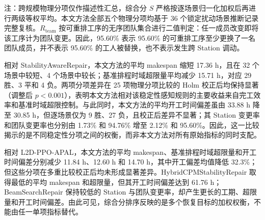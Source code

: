 \documentclass[journal,10pt]{IEEEtran}
\begin{document}
注：跨规模物理分项仅作描述性汇总，综合分 \(S\) 严格按逐场景归一化加权后再进行两级等权平均。本文方法全部五个物理分项均基于 36 个锁定扰动场景推断记录完整复核。\(R_{\mathrm{team}}\) 按可重排工序的无序团队集合进行二值判定：任一成员改变即将该工序计为团队变更。因此，95.60\% 表示 95.60\% 的可重排工序至少更换了一名团队成员，并不表示 95.60\% 的工人被替换，也不表示发生跨 Station 调动。

相对 Stability\allowbreak{}Aware\allowbreak{}Repair，本文方法的平均 makespan 缩短 17.36 h，且在 32 个场景中较短、4 个场景中较长；基准排程时域超限量平均减少 15.71 h，对应 29 胜、3 平和 4 负。两项分项差异在 25 项物理分项比较的 Holm 校正后均保持显著（调整后 \(p<0.001\)），表明本文方法相对该稳定性感知规则的主要收益来自完工效率和基准时域超限控制。与此同时，本文方法的平均开工时间偏差虽由 33.88 h 降至 30.85 h，但逐场景仅为 9 胜、27 负，且校正后差异不显著；其 Station 变更率和团队变更率也分别由 1.73\% 和 94.76\% 增至 2.12\% 和 95.60\%。因此，这一比较揭示的是不同稳定性分项之间的权衡，而非本文方法对所有原始指标的同时支配。

相对 L2D-PPO-APAL，本文方法的平均 makespan、基准排程时域超限量和开工时间偏差分别减少 11.84 h、12.60 h 和 14.70 h，其中开工偏差均值降低 32.3\%；但这些分项在多重比较校正后均未形成显著差异。Hybrid\allowbreak{}CPM\allowbreak{}Stability\allowbreak{}Repair 取得最低的平均 makespan 和超限量，但其开工时间偏差达到 61.76 h；Beam\allowbreak{}Search\allowbreak{}Repair 保持较低的 Station 与团队变更率，却产生更长的工期、超限量和开工时间偏差。由此可见，综合分排序反映的是多个恢复目标的加权权衡，不能由任一单项指标替代。
\end{document}
